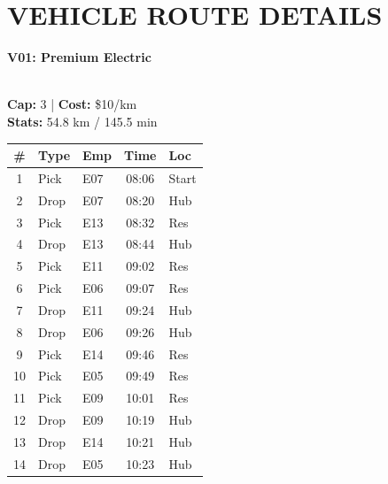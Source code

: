\documentclass[a4paper,11pt]{article}
\begin{document}
\vspace{0.1cm}

\section*{\uppercase{\color{velorablue} Vehicle Route Details}}
\vspace{-0.3cm}

\noindent
\begin{minipage}[t]{0.32\textwidth}
    \centering
    \colorbox{velorablue}{\parbox{\dimexpr\linewidth-2\fboxsep}{\centering \color{white}\textbf{V01: Premium Electric}}} \\
    \vspace{0.05cm}
    {\tiny \textbf{Cap:} 3 | \textbf{Cost:} \$10/km \\ \textbf{Stats:} 54.8 km / 145.5 min}
    \vspace{0.05cm}
    
    \renewcommand{\arraystretch}{0.85}
    \setlength{\tabcolsep}{1pt}
    \tiny 
    \begin{tabular}{c l l c l}
        \toprule
        \textbf{\#} & \textbf{Type} & \textbf{Emp} & \textbf{Time} & \textbf{Loc} \\
        \midrule
        1 & Pick & E07 & 08:06 & Start \\
        \rowcolor{headergray} 2 & Drop & E07 & 08:20 & Hub \\
        3 & Pick & E13 & 08:32 & Res \\
        \rowcolor{headergray} 4 & Drop & E13 & 08:44 & Hub \\
        5 & Pick & E11 & 09:02 & Res \\
        \rowcolor{headergray} 6 & Pick & E06 & 09:07 & Res \\
        7 & Drop & E11 & 09:24 & Hub \\
        \rowcolor{headergray} 8 & Drop & E06 & 09:26 & Hub \\
        9 & Pick & E14 & 09:46 & Res \\
        \rowcolor{headergray} 10 & Pick & E05 & 09:49 & Res \\
        11 & Pick & E09 & 10:01 & Res \\
        \rowcolor{headergray} 12 & Drop & E09 & 10:19 & Hub \\
        13 & Drop & E14 & 10:21 & Hub \\
        \rowcolor{headergray} 14 & Drop & E05 & 10:23 & Hub \\
        \bottomrule
    \end{tabular}
\end{minipage}
\end{document}
